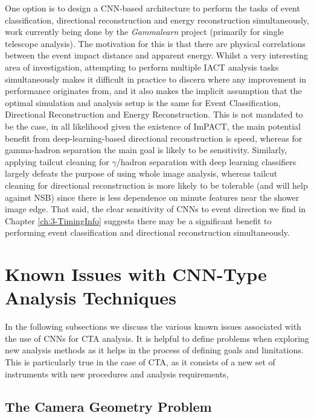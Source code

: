 One option is to design a CNN-based architecture to perform the tasks of event classification, directional reconstruction and energy reconstruction simultaneously, work currently being done by the \textit{Gammalearn} project \cite{mikaelphd} (primarily for single telescope analysis). The motivation for this is that there are physical correlations between the event impact distance and apparent energy. Whilst a very interesting area of investigation, attempting to perform multiple IACT analysis tasks simultaneously makes it difficult in practice to discern where any improvement in performance originates from, and it also makes the implicit assumption that the optimal simulation and analysis setup is the same for Event Classification, Directional Reconstruction and Energy Reconstruction. This is not mandated to be the case, in all likelihood given the existence of ImPACT, the main potential benefit from deep-learning-based directional reconstruction is speed, whereas for gamma-hadron separation the main goal is likely to be sensitivity. Similarly, applying tailcut cleaning for $\gamma$/hadron separation with deep learning classifiers largely defeats the purpose of using whole image analysis, whereas tailcut cleaning for directional reconstruction is more likely to be tolerable (and will help against NSB) since there is less dependence on minute features near the shower image edge. That said, the clear sensitivity of CNNs to event direction we find in Chapter \ref{ch:3-TimingInfo} suggests there may be a significant benefit to performing event classification and directional reconstruction simultaneously.

\section{Known Issues with CNN-Type Analysis Techniques}
In the following subsections we discuss the various known issues associated with the use of CNNs for CTA analysis. It is helpful to define problems when exploring new analysis methods as it helps in the process of defining goals and limitations. This is particularly true in the case of CTA, as it consists of a new set of instruments with new procedures and analysis requirements,

\subsection{The Camera Geometry Problem}

